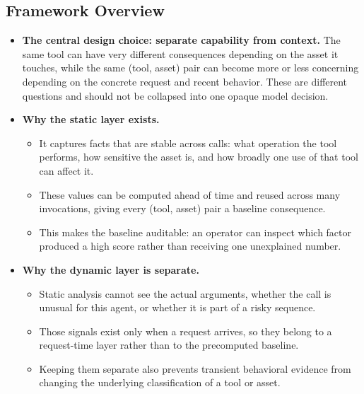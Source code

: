 \subsection{Framework Overview}
\label{sec:overview}
\begin{itemize}
  \item \textbf{The central design choice: separate capability from context.}
        The same tool can have very different consequences depending on the
        asset it touches, while the same (tool, asset) pair can become more or
        less concerning depending on the concrete request and recent behavior.
        These are different questions and should not be collapsed into one
        opaque model decision.

  \item \textbf{Why the static layer exists.}
    \begin{itemize}
      \item It captures facts that are stable across calls: what operation the
            tool performs, how sensitive the asset is, and how broadly one use
            of that tool can affect it.
      \item These values can be computed ahead of time and reused across many
            invocations, giving every (tool, asset) pair a baseline consequence.
      \item This makes the baseline auditable: an operator can inspect which
            factor produced a high score rather than receiving one unexplained
            number.
    \end{itemize}

  \item \textbf{Why the dynamic layer is separate.}
    \begin{itemize}
      \item Static analysis cannot see the actual arguments, whether the call is
            unusual for this agent, or whether it is part of a risky sequence.
      \item Those signals exist only when a request arrives, so they belong to a
            request-time layer rather than to the precomputed baseline.
      \item Keeping them separate also prevents transient behavioral evidence
            from changing the underlying classification of a tool or asset.
    \end{itemize}


\end{itemize}
